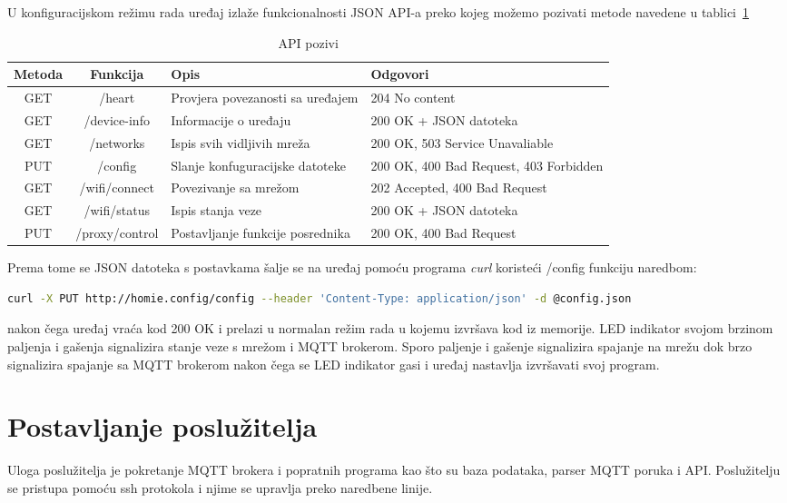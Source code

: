 \documentclass[times, utf8, zavrsni]{fer}
\begin{document}
{U konfiguracijskom režimu rada uređaj izlaže funkcionalnosti JSON API-a preko kojeg možemo pozivati metode navedene u tablici~\ref{tab:API}
    \begin{table}[h]
        \centering
        \begin{tabular}{ |c|c|p{4cm}|p{4cm}| }
            \hline
            Metoda & Funkcija & Opis & Odgovori\\
            \hline
            GET & /heart & Provjera povezanosti sa uređajem & 204 No content \\
            \hline
            GET & /device-info & Informacije o uređaju & 200 OK + JSON datoteka\\
            \hline
            GET & /networks & Ispis svih vidljivih mreža & 200 OK, 503 Service Unavaliable \\
            \hline
            PUT & /config & Slanje konfuguracijske datoteke & 200 OK, 400 Bad Request, 403 Forbidden\\
            \hline
            GET & /wifi/connect & Povezivanje sa mrežom & 202 Accepted, 400 Bad Request\\
            \hline
            GET & /wifi/status & Ispis stanja veze & 200 OK + JSON datoteka\\
            \hline
            PUT & /proxy/control & Postavljanje funkcije posrednika & 200 OK, 400 Bad Request\\
            \hline
        \end{tabular}
        \caption{API pozivi}\label{tab:API}
    \end{table}
Prema tome se JSON datoteka s postavkama šalje se na uređaj pomoću programa \textit{curl} koristeći /config funkciju naredbom:
\begin{lstlisting}[language=Bash]
curl -X PUT http://homie.config/config --header 'Content-Type: application/json' -d @config.json
\end{lstlisting}

nakon čega uređaj vraća kod 200 OK i prelazi u normalan režim rada u kojemu izvršava kod iz memorije.
LED indikator svojom brzinom paljenja i gašenja signalizira stanje veze s mrežom i MQTT brokerom.
Sporo paljenje i gašenje signalizira spajanje na mrežu dok brzo signalizira spajanje sa MQTT brokerom nakon čega se LED indikator gasi i uređaj nastavlja izvršavati svoj program.



\section{Postavljanje poslužitelja}
Uloga poslužitelja je pokretanje MQTT brokera i popratnih programa kao što su baza podataka, parser MQTT poruka i API.
Poslužitelju se pristupa pomoću ssh protokola i njime se upravlja preko naredbene linije.

}
\end{document}
